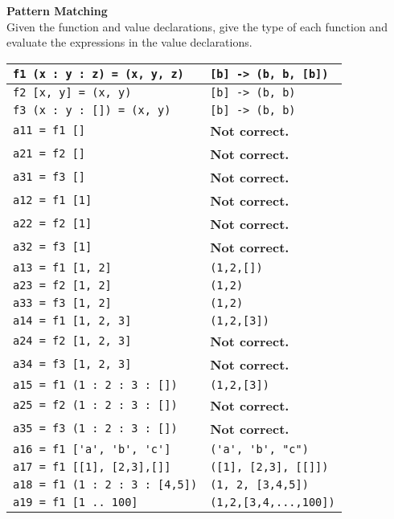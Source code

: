 \textbf{Pattern Matching}\\
Given the function and value declarations, give the type of each function and evaluate the expressions in the value declarations.\\
\begin{tabularx}{\linewidth}{|l|X|}
  \hline
  \lstinline|f1 (x : y : z) = (x, y, z)| & \lstinline|[b] -> (b, b, [b])|\\
  \hline
  \lstinline|f2 [x, y] = (x, y)| & \lstinline|[b] -> (b, b)|\\
  \hline
  \lstinline|f3 (x : y : []) = (x, y)| & \lstinline|[b] -> (b, b)|\\
  \hline
  \lstinline|a11 = f1 []| & \textbf{Not correct.}\\
  \hline
  \lstinline|a21 = f2 []| & \textbf{Not correct.}\\
  \hline
  \lstinline|a31 = f3 []| & \textbf{Not correct.}\\
  \hline
  \lstinline|a12 = f1 [1]| & \textbf{Not correct.}\\
  \hline
  \lstinline|a22 = f2 [1]| & \textbf{Not correct.}\\
  \hline
  \lstinline|a32 = f3 [1]| & \textbf{Not correct.}\\
  \hline
  \lstinline|a13 = f1 [1, 2]| & \lstinline|(1,2,[])|\\
  \hline
  \lstinline|a23 = f2 [1, 2]| & \lstinline|(1,2)|\\
  \hline
  \lstinline|a33 = f3 [1, 2]| & \lstinline|(1,2)|\\
  \hline
  \lstinline|a14 = f1 [1, 2, 3]| & \lstinline|(1,2,[3])|\\
  \hline
  \lstinline|a24 = f2 [1, 2, 3]| & \textbf{Not correct.}\\
  \hline
  \lstinline|a34 = f3 [1, 2, 3]| & \textbf{Not correct.}\\
  \hline
  \lstinline|a15 = f1 (1 : 2 : 3 : [])| & \lstinline|(1,2,[3])|\\
  \hline
  \lstinline|a25 = f2 (1 : 2 : 3 : [])| & \textbf{Not correct.}\\
  \hline
  \lstinline|a35 = f3 (1 : 2 : 3 : [])| & \textbf{Not correct.}\\
  \hline
  \lstinline|a16 = f1 ['a', 'b', 'c']| & \lstinline|('a', 'b', "c")|\\
  \hline
  \lstinline|a17 = f1 [[1], [2,3],[]]| & \lstinline|([1], [2,3], [[]])|\\
  \hline
  \lstinline|a18 = f1 (1 : 2 : 3 : [4,5])| & \lstinline|(1, 2, [3,4,5])|\\
  \hline
  \lstinline|a19 = f1 [1 .. 100]| & \lstinline|(1,2,[3,4,...,100])|\\
  \hline
\end{tabularx}
